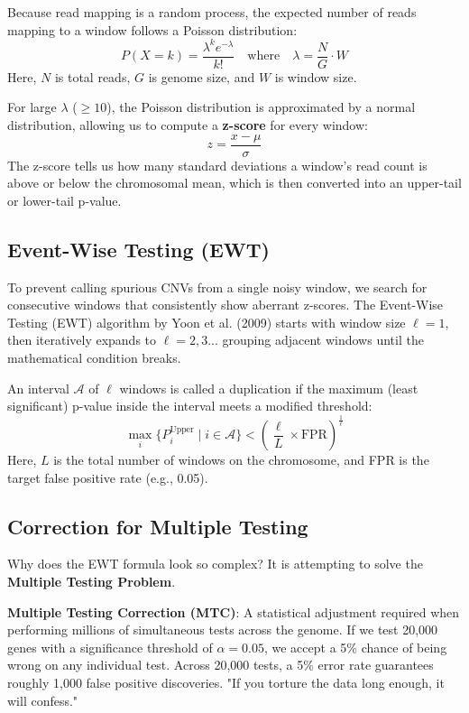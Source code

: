 Because read mapping is a random process, the expected number of reads mapping to a window follows a Poisson distribution:
\begin{equation}
    P(X = k) = \frac{\lambda^k e^{-\lambda}}{k!} \quad \text{where} \quad \lambda = \frac{N}{G} \cdot W
\end{equation}
Here, $N$ is total reads, $G$ is genome size, and $W$ is window size. 

For large $\lambda$ ($\ge 10$), the Poisson distribution is approximated by a normal distribution, allowing us to compute a \textbf{z-score} for every window:
\begin{equation}
    z = \frac{x - \mu}{\sigma}
\end{equation}
The z-score tells us how many standard deviations a window's read count is above or below the chromosomal mean, which is then converted into an upper-tail or lower-tail p-value.

\subsection{Event-Wise Testing (EWT)}

To prevent calling spurious CNVs from a single noisy window, we search for consecutive windows that consistently show aberrant z-scores. The Event-Wise Testing (EWT) algorithm by Yoon et al. (2009) starts with window size $\ell=1$, then iteratively expands to $\ell=2, 3...$ grouping adjacent windows until the mathematical condition breaks.

An interval $\mathcal{A}$ of $\ell$ windows is called a duplication if the maximum (least significant) p-value inside the interval meets a modified threshold:
\begin{equation}
    \max_i \{ P_i^{\text{Upper}} \mid i \in \mathcal{A} \} < \left( \frac{\ell}{L} \times \text{FPR} \right)^{\frac{1}{\ell}}
\end{equation}
Here, $L$ is the total number of windows on the chromosome, and FPR is the target false positive rate (e.g., 0.05). 

\subsection{Correction for Multiple Testing}

Why does the EWT formula look so complex? It is attempting to solve the \textbf{Multiple Testing Problem}.

\begin{important}
  \textbf{Multiple Testing Correction (MTC)}: A statistical adjustment required when performing millions of simultaneous tests across the genome. If we test 20,000 genes with a significance threshold of $\alpha = 0.05$, we accept a 5\% chance of being wrong on any individual test. Across 20,000 tests, a 5\% error rate guarantees roughly 1,000 false positive discoveries. "If you torture the data long enough, it will confess."
\end{important}

